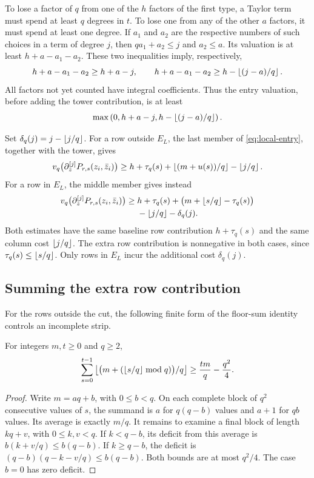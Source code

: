 To lose a factor of $q$ from one of the $h$ factors of the first type, a
Taylor term must spend at least $q$ degrees in $t$. To lose one from any of
the other $a$ factors, it must spend at least one degree. If $a_1$ and $a_2$
are the respective numbers of such choices in a term of degree $j$, then
$qa_1+a_2\leq j$ and $a_2\leq a$. Its valuation is at least
$h+a-a_1-a_2$. These two inequalities imply, respectively,
\[
 h+a-a_1-a_2\geq h+a-j,
 \qquad
 h+a-a_1-a_2\geq h-\left\lfloor (j-a)/q\right\rfloor.
\]
All factors not yet counted have integral coefficients. Thus the entry
valuation, before adding the tower contribution, is at least
\begin{equation}\label{eq:local-entry}
 \max\left(0,h+a-j,h-\left\lfloor (j-a)/q\right\rfloor\right).
\end{equation}

Set $\delta_q(j)=j-\left\lfloor j/q\right\rfloor$. For a row outside $E_L$, the last member
of \eqref{eq:local-entry}, together with the tower, gives
\begin{equation}\label{eq:local-entry-low}
 v_q\bigl(\partial_z^{[j]}P_{r,s}(z_i,\bar z_i)\bigr)
 \geq h+\tau_q(s)+\left\lfloor (m+u(s))/q\right\rfloor-\left\lfloor j/q\right\rfloor.
\end{equation}
For a row in $E_L$, the middle member gives instead
\begin{align}
 v_q\bigl(\partial_z^{[j]}P_{r,s}(z_i,\bar z_i)\bigr)
 \geq{}&h+\tau_q(s)
       +\bigl(m+\left\lfloor s/q\right\rfloor-\tau_q(s)\bigr)\notag\\
       &-\left\lfloor j/q\right\rfloor-\delta_q(j).
 \label{eq:local-entry-high}
\end{align}
Both estimates have the same baseline row contribution $h+\tau_q(s)$
and the same column cost $\left\lfloor j/q\right\rfloor$. The extra row contribution is
nonnegative in both cases, since $\tau_q(s)\leq\left\lfloor s/q\right\rfloor$.
Only rows in $E_L$ incur the additional cost $\delta_q(j)$.

\subsection{Summing the extra row contribution}
For the rows outside the cut, the following finite form of the floor-sum
identity controls an incomplete strip.

\begin{lemma}\label{lem:local-Hermite}
For integers $m,t\geq0$ and $q\geq2$,
\[
 \sum_{s=0}^{t-1}\left\lfloor \bigl(m+(\left\lfloor s/q\right\rfloor\bmod q)\bigr)/q\right\rfloor
 \geq\frac{tm}{q}-\frac{q^2}{4}.
\]
\end{lemma}
\begin{proof}
Write $m=aq+b$, with $0\leq b<q$. On each complete block of $q^2$
consecutive values of $s$, the summand is $a$ for $q(q-b)$ values and
$a+1$ for $qb$ values. Its average is exactly $m/q$.
It remains to examine a final block of length $kq+v$, with
$0\leq k,v<q$. If $k<q-b$, its deficit from this average is
$b(k+v/q)\leq b(q-b)$. If $k\geq q-b$, the deficit is
$(q-b)(q-k-v/q)\leq b(q-b)$. Both bounds are at most $q^2/4$.
The case $b=0$ has zero deficit.
\end{proof}

